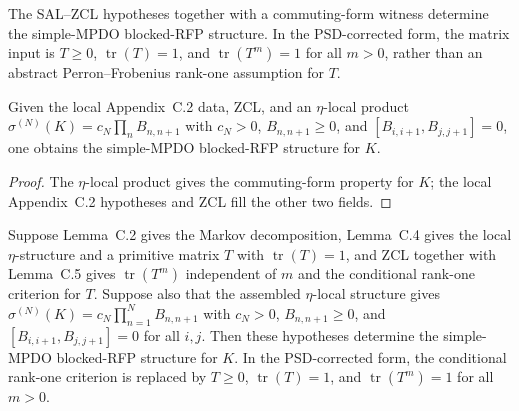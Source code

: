 \begin{theorem}
    \label{thm:simple_mpdo_blocked_rfp_data_of_sal_zcl_and_commuting_form}
    \leanok
    The SAL--ZCL hypotheses together with a commuting-form witness determine
    the simple-MPDO blocked-RFP structure. In the PSD-corrected form, the
    matrix input is $T\ge0$, $\operatorname{tr}(T)=1$, and
    $\operatorname{tr}(T^m)=1$ for all $m>0$, rather than an abstract
    Perron--Frobenius rank-one assumption for $T$.
\end{theorem}

\begin{theorem}
    \label{thm:simple_mpdo_blocked_rfp_data_of_eta_local_structure}
    \leanok
    Given the local Appendix~C.2 data, ZCL, and an $\eta$-local product
    $\sigma^{(N)}(K)=c_N\prod_n B_{n,n+1}$ with $c_N>0$,
    $B_{n,n+1}\ge0$, and $[B_{i,i+1},B_{j,j+1}]=0$, one obtains the
    simple-MPDO blocked-RFP structure for $K$.
\end{theorem}

\begin{proof}\leanok
    The $\eta$-local product gives the commuting-form property for $K$; the local
    Appendix~C.2 hypotheses and ZCL fill the other two fields.
\end{proof}

\begin{theorem}
    \label{thm:simple_mpdo_blocked_rfp_data_of_sal_zcl_and_eta_local_structure}
    \leanok
    Suppose Lemma~C.2 gives the Markov decomposition, Lemma~C.4 gives the
    local $\eta$-structure and a primitive matrix $T$ with
    $\operatorname{tr}(T)=1$, and ZCL together with Lemma~C.5 gives
    $\operatorname{tr}(T^m)$ independent of $m$ and the conditional rank-one
    criterion for $T$. Suppose also that the assembled $\eta$-local structure gives
    $\sigma^{(N)}(K)=c_N\prod_{n=1}^N B_{n,n+1}$ with $c_N>0$,
    $B_{n,n+1}\ge 0$, and $[B_{i,i+1},B_{j,j+1}]=0$ for all $i,j$.
    Then these hypotheses determine the simple-MPDO blocked-RFP structure for $K$.
    In the PSD-corrected form, the conditional rank-one criterion is replaced
    by $T\ge0$, $\operatorname{tr}(T)=1$, and
    $\operatorname{tr}(T^m)=1$ for all $m>0$.
\end{theorem}

